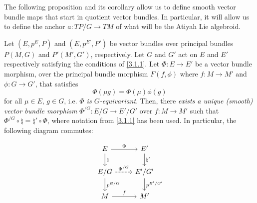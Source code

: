 The following proposition and its corollary allow us to define smooth vector bundle maps that start in quotient vector bundles. In particular, it will allow us to define the anchor $a:TP/G \to TM$ of what will be the Atiyah Lie algebroid.

\begin{proposition} \label{3.1.2}
Let $(E, p^E, P)$ and $(E, p^{E'}, P')$ be vector bundles over principal bundles $P(M, G)$ and $P'(M', G')$, respectively. Let $G$ and $G'$ act on $E$ and $E'$ respectively satisfying the conditions of \ref{3.1.1}. Let $\Phi: E \to E'$ be a vector bundle morphism, over the principal bundle morphism $F(f, \phi)$ where $f:M\to M'$ and $\phi:G \to G'$, that satisfies \[\Phi(\mu g) = \Phi(\mu) \phi(g)\] for all $\mu \in E$, $g \in G$, i.e. \emph{$\Phi$ is $G$-equivariant}. Then, there \emph{exists a unique (smooth) vector bundle morphism} $\Phi^{/G}: E/G \to E'/G'$ over $f: M \to M'$ such that $\Phi^{/G} \circ \natural = \natural' \circ \Phi$, where notation from \ref{3.1.1} has been used. In particular, the following diagram commutes:

\begin{equation}
\begin{tikzcd}
    E   \ar{r}{\Phi}     \ar{d}{\natural} &   E'  \ar{d}{\natural'} \\
    E/G \ar[dashed]{r}{\Phi^{/G}} \ar{d}{p^{E/G}}  & E'/G' \ar{d}{p^{E'/G'}} \\
    M \ar{r}{f} & M'
\end{tikzcd}
\end{equation}
\end{proposition}

